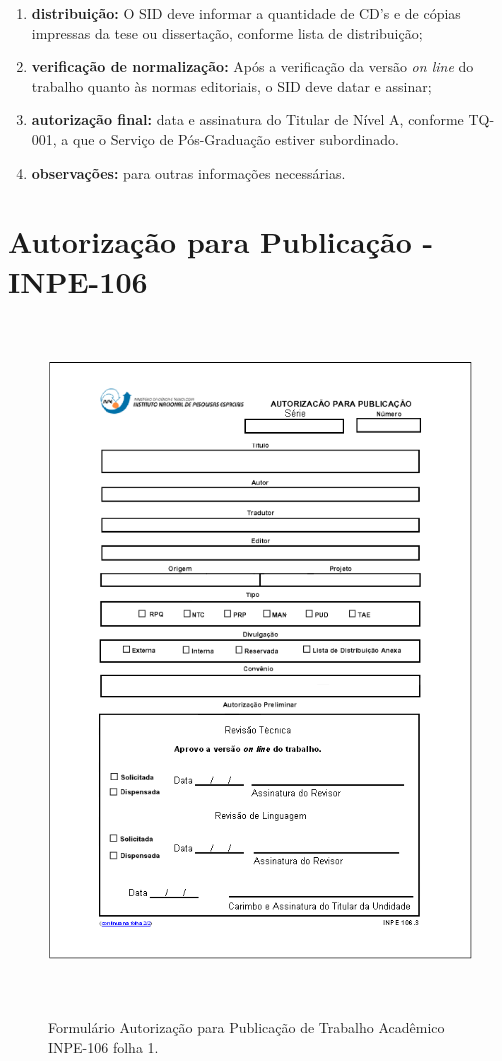 \begin{enumerate}
 \item \textbf{distribuição:} O SID deve informar a quantidade de CD's e de cópias impressas da tese ou dissertação, conforme lista de distribuição;
 
 \item \textbf{verificação de normalização:}  Após a verificação da versão \emph{on line} do trabalho quanto às normas editoriais, o SID deve datar e assinar;
 
 \item \textbf{autorização final:} data e assinatura do Titular de Nível A, conforme TQ-001, a que o Serviço de Pós-Graduação estiver subordinado.
 
 \item \textbf{observações:} para outras informações necessárias. 

\end{enumerate}

\section{Autorização para Publicação - INPE-106}
\begin{figure}[h!]
	\caption{Formulário Autorização para Publicação de Trabalho Acadêmico INPE-106 folha 1.} 
	\vspace{6mm}	%
	\centering
	\includegraphics[height=18cm]{./docs/figs/form106.png}
	\label{form106}
\end{figure}

